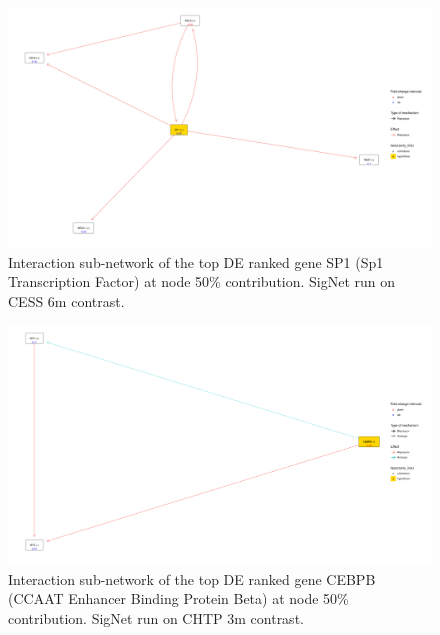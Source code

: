 \begin{figure}[!htbp]
    \centering
    \includegraphics[width=\textwidth, height=\textheight, keepaspectratio]{Major Thesis/figures/iut/graph/CESS6m50-SP1.png}
    \caption{Interaction sub-network of the top DE ranked gene SP1 (Sp1 Transcription Factor) at node 50\% contribution. SigNet run on CESS 6m contrast.}
\end{figure}

\begin{figure}[!htbp]
    \centering
    \includegraphics[width=\textwidth, height=\textheight, keepaspectratio]{Major Thesis/figures/iut/graph/CHTP3m-CEBPB.png}
    \caption{Interaction sub-network of the top DE ranked gene CEBPB (CCAAT Enhancer Binding Protein Beta) at node 50\% contribution. SigNet run on CHTP 3m contrast.}
\end{figure}

